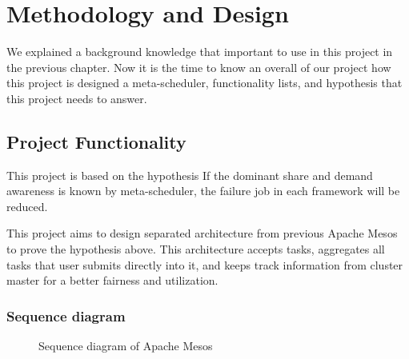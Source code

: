 \documentclass[12pt,oneside,openright,a4paper]{cpe-english-project}
\begin{document}
\chapter{Methodology and Design}

We explained a background knowledge that important to use in this project in the previous chapter. Now it is the time to know an overall of our project how this project is designed a meta-scheduler, functionality lists, and hypothesis that this project needs to answer.

\section{Project Functionality}
This project is based on the hypothesis If the dominant share and demand awareness is known by meta-scheduler, the failure job in each framework will be reduced.

This project aims to design separated architecture from previous Apache Mesos to prove the hypothesis above. This architecture accepts tasks, aggregates all tasks that user submits directly into it, and keeps track information from cluster master for a better fairness and utilization.

\subsection{Sequence diagram} 
\begin{figure}[!h]\centering
\setlength{\fboxrule}{0mm} %
\setlength{\fboxsep}{0cm}
\caption{Sequence diagram of Apache Mesos}\label{fig:SequenceDiagram}
\end{figure}
\end{document}
